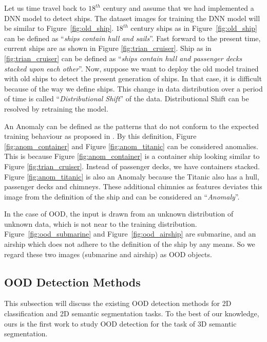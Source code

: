 Let us time travel back to $18^{th}$ century and assume that we had implemented a DNN model to detect ships.
The dataset images for training the DNN model will be similar to Figure~\ref{fig:old_ship}.
$18^{th}$ century ships as in Figure~\ref{fig:old_ship} can be defined as ``\textit{ships contain hull and sails}''.
Fast forward to the present time, current ships are as shown in Figure \ref{fig:trian_cruiser}.
Ship as in \ref{fig:trian_cruiser} can be defined as ``\textit{ships contain hull and passenger decks stacked upon each other}''.
Now, suppose we want to deploy the old model trained with old ships to detect
the present generation of ships. In that case, it is difficult because of the way we define ships.
This change in data distribution over a period of time is called ``\textit{Distributional Shift}'' of the data.
Distributional Shift can be resolved by retraining the model.

An Anomaly can be defined as the patterns that do not conform to the expected training behaviour as proposed in  \cite{anomaly_sec1_1}.
By this definition, Figure \ref{fig:anom_container} and Figure \ref{fig:anom_titanic} can be considered anomalies.
This is because Figure \ref{fig:anom_container} is a container ship looking similar to Figure \ref{fig:trian_cruiser}. Instead of passenger decks, we have containers stacked.
Figure \ref{fig:anom_titanic} is also an Anomaly because the Titanic also has a hull, passenger decks
and chimneys. These additional chimnies as features deviates this image from the definition of the ship
and can be considered an ``\textit{Anomaly}''.

In the case of OOD, the input is drawn from an unknown distribution of unknown data, which is not near to the training distribution.
Figure~\ref{fig:ood_submarine} and Figure~\ref{fig:ood_airship} are submarine, and an airship which does not adhere to the definition of the ship by any means.
So we regard these two images (submarine and airship) as OOD objects.


    \subsection{OOD Detection Methods}
    This subsection will discuss the existing OOD detection methods for 2D classification and 2D semantic segmentation tasks.
    To the best of our knowledge, ours is the first work to study OOD detection for the task of 3D semantic segmentation.

